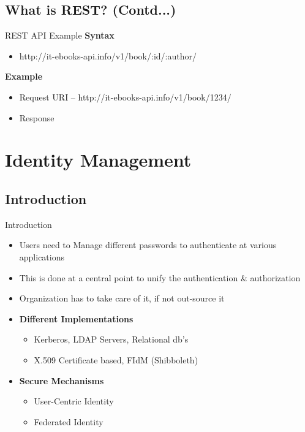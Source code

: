\documentclass[10pt,xcolor=dvipsnames]{beamer}
\begin{document}
\subsection{What is REST? (Contd...)}
\begin{frame}{REST API Example}
\textbf{Syntax}
\begin{itemize}
	\item http://it-ebooks-api.info/v1/book/:id/:author/
\end{itemize}
\textbf{Example}
\begin{itemize}
	\item Request URI -- http://it-ebooks-api.info/v1/book/1234/
	\item Response 
\end{itemize}


\end{frame}

\section{Identity Management}
\subsection{Introduction}
\begin{frame}{Introduction}
\begin{itemize}
	\item Users need to Manage different passwords to authenticate at various applications
	\item This is done at a central point to unify the authentication \& authorization
	\item Organization has to take care of it, if not out-source it
	\item \textbf{Different Implementations}
\begin{itemize}
	\item Kerberos, LDAP Servers, Relational db's
	\item X.509 Certificate based, FIdM (Shibboleth)
\end{itemize}
	\item \textbf{Secure Mechanisms}
\begin{itemize}
	\item User-Centric Identity
	\item Federated Identity
\end{itemize}
\end{itemize}
\end{frame}
\end{document}

